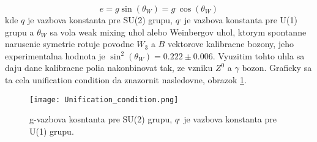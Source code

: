 \documentclass[../../main.tex]{subfiles}
\begin{document}
$$
e=g\sin(\theta_W)=g^,\cos(\theta_W)
$$
kde $q$ je vazbova konstanta pre SU(2) grupu, $q^,$ je vazbova konstanta pre U(1) grupu a $\theta_W$ sa vola weak mixing uhol alebo Weinbergov uhol, ktorym spontanne narusenie symetrie rotuje povodne $W_3$ a $B$ vektorove kalibracne bozony, jeho experimentalna hodnota je $\sin^2(\theta_W)=0.222\pm0.006$. Vyuzitim tohto uhla sa daju dane kalibracne polia nakonbinovat tak, ze vzniku $Z^0$ a $\gamma$ bozon. Graficky sa ta cela unification condition da znazornit nasledovne, obrazok \ref{sf1:fig:unifi}.
\begin{figure}[!h]
\centering
\texttt{[image: Unification\_condition.png]}
\caption{g-vazbova kosntanta pre SU(2) grupu, $q^{,}$ je vazbova konstanta pre U(1) grupu.}
\label{sf1:fig:unifi}
\end{figure}
\end{document}
